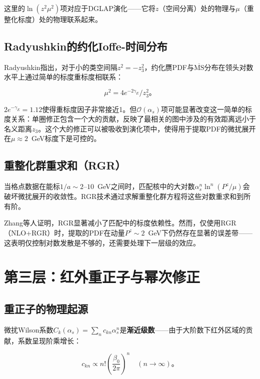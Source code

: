 \documentclass[12pt,a4paper]{ctexart}
\theoremstyle{definition}
\begin{document}
这里的$\ln(z^2\mu^2)$项对应于DGLAP演化——它将$z$（空间分离）处的物理与$\mu$（重整化标度）处的物理联系起来。

\subsection{Radyushkin的约化Ioffe-时间分布}

Radyushkin指出\cite{Radyushkin2018one_loop}，对于小的类空间隔$z^2 = -z^2_3$，约化赝PDF与$\overline{\text{MS}}$分布在领头对数水平上通过简单的标度重标度相联系：

\begin{equation}
\mu^2 = 4e^{-2\gamma_E}/z^2_3。
\label{eq:scale_rescaling}
\end{equation}

$2e^{-\gamma_E} = 1.12$使得重标度因子非常接近1。但$\mathcal{O}(\alpha_s)$项可能显著改变这一简单的标度关系：单圈修正包含一个大的贡献，反映了最相关的图中涉及的有效距离远小于名义距离$z_3$\cite{Radyushkin2018one_loop}。这个大的修正可以被吸收到演化项中，使得用于提取PDF的微扰展开在$\mu \approx 2$~GeV标度下是可控的。

\subsection{重整化群重求和（RGR）}

当格点数据在能标$1/a \sim 2\text{--}10$~GeV之间时，匹配核中的大对数$\alpha_s^n \ln^n(P^z/\mu)$会破坏微扰展开的收敛性。RGR技术通过求解重整化群方程将这些对数重求和到所有阶\cite{Zhang2023RGR}。

Zhang等人\cite{Zhang2023RGR}证明，RGR显著减小了匹配中的标度依赖性。然而，仅使用RGR（NLO+RGR）时，提取的PDF在动量$P^z \sim 2$~GeV下仍然存在显著的误差带——这表明仅控制对数发散是不够的，还需要处理下一层级的效应。

\section{第三层：红外重正子与幂次修正}

\subsection{重正子的物理起源}

微扰Wilson系数$C_k(\alpha_s) = \sum_n c_{kn} \alpha_s^n$是\textbf{渐近级数}——由于大阶数下红外区域的贡献，系数呈现阶乘增长\cite{Su2023LRR,Zhang2023RGR,Braun2019power}：

\begin{equation}
c_{kn} \propto n! \left(\frac{\beta_0}{2\pi}\right)^n \quad (n \to \infty)。
\label{eq:renormalon_growth}
\end{equation}
\end{document}
